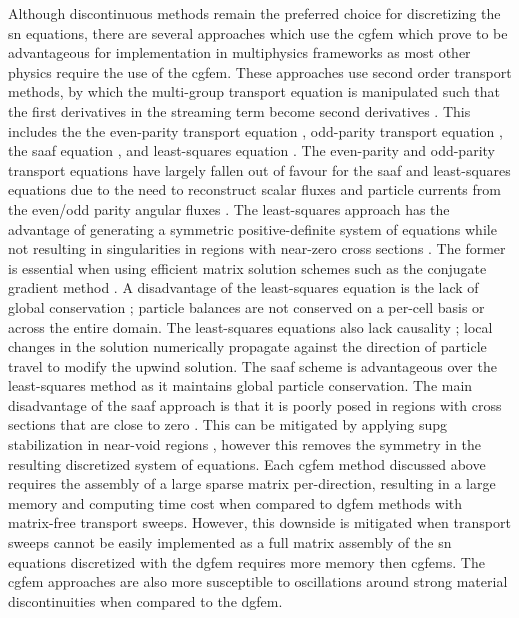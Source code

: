 Although discontinuous methods remain the preferred choice for discretizing the \acrshort{sn} equations, there are several approaches which use the \acrshort{cgfem} which prove to be advantageous for implementation in multiphysics frameworks as most other physics require the use of the \acrshort{cgfem}. These approaches use second order transport methods, by which the multi-group transport equation is manipulated such that the first derivatives in the streaming term become second derivatives \cite{computational_methods}. This includes the the even-parity transport equation \cite{computational_methods}, odd-parity transport equation \cite{computational_methods}, the \acrfull{saaf} equation \cite{cgfem_saaf_1,cgfem_saaf_sn_2,cgfem_saaf_sn_3}, and least-squares equation \cite{cgfem_ls_sn_1,cgfem_ls_sn_2}. The even-parity and odd-parity transport equations have largely fallen out of favour for the \acrshort{saaf} and least-squares equations due to the need to reconstruct scalar fluxes and particle currents from the even/odd parity angular fluxes \cite{computational_methods}. The least-squares approach has the advantage of generating a symmetric positive-definite system of equations while not resulting in singularities in regions with near-zero cross sections \cite{cgfem_ls_sn_1,cgfem_ls_sn_2}. The former is essential when using efficient matrix solution schemes such as the conjugate gradient method \cite{cgfem_ls_sn_1,cgfem_ls_sn_2}. A disadvantage of the least-squares equation is the lack of global conservation \cite{cgfem_ls_sn_1,cgfem_ls_sn_2}; particle balances are not conserved on a per-cell basis or across the entire domain. The least-squares equations also lack causality \cite{cgfem_ls_sn_2}; local changes in the solution numerically propagate against the direction of particle travel to modify the upwind solution. The \acrshort{saaf} scheme is advantageous over the least-squares method as it maintains global particle conservation. The main disadvantage of the \acrshort{saaf} approach is that it is poorly posed in regions with cross sections that are close to zero \cite{cgfem_saaf_1,cgfem_saaf_sn_2,cgfem_saaf_sn_3}. This can be mitigated by applying \acrfull{supg} stabilization in near-void regions \cite{cgfem_saaf_sn_2}, however this removes the symmetry in the resulting discretized system of equations. Each \acrshort{cgfem} method discussed above requires the assembly of a large sparse matrix per-direction, resulting in a large memory and computing time cost when compared to \acrshort{dgfem} methods with matrix-free transport sweeps. However, this downside is mitigated when transport sweeps cannot be easily implemented as a full matrix assembly of the \acrshort{sn} equations discretized with the \acrshort{dgfem} requires more memory then \acrshort{cgfem}s. The \acrshort{cgfem} approaches are also more susceptible to oscillations around strong material discontinuities when compared to the \acrshort{dgfem}.

